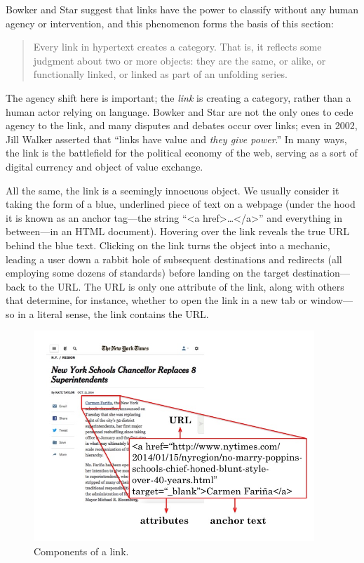 Bowker and Star suggest that links have the power to classify without any human agency or intervention, and this phenomenon forms the basis of this section: \blockquote{Every link in hypertext creates a category. That is, it reflects some judgment about two or more objects: they are the same, or alike, or functionally linked, or linked as part of an unfolding series.}\autocite[7]{bowker_sorting_2000} The agency shift here is important; the \emph{link} is creating a category, rather than a human actor relying on language. Bowker and Star are not the only ones to cede agency to the link, and many disputes and debates occur over links; even in 2002, Jill Walker asserted that ``links have value and \emph{they give power}.''\autocite{walker_links_2002} In many ways, the link is the battlefield for the political economy of the web, serving as a sort of digital currency and object of value exchange.

All the same, the link is a seemingly innocuous object. We usually consider it taking the form of a blue, underlined piece of text on a webpage (under the hood it is known as an anchor tag---the string ``<a href>\ldots</a>'' and everything in between---in an HTML document). Hovering over the link reveals the true URL behind the blue text. Clicking on the link turns the object into a mechanic, leading a user down a rabbit hole of subsequent destinations and redirects (all employing some dozens of standards) before landing on the target destination---back to the URL. The URL is only one attribute of the link, along with others that determine, for instance, whether to open the link in a new tab or window---so in a literal sense, the link contains the URL.

\begin{figure}[ht]
\centering
\includegraphics[width=300pt]{figures/annotatedlink}
\caption{Components of a link.}
\label{fig:annotatedlink}
\end{figure}

